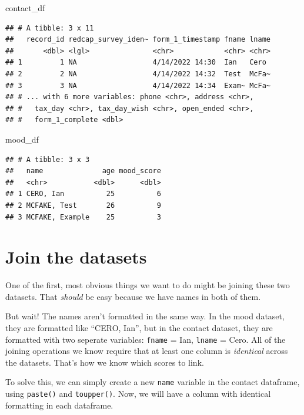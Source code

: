 \documentclass[
]{book}
\newenvironment{Shaded}{\begin{snugshade}}{\end{snugshade}}
\newcommand{\NormalTok}[1]{#1}
\begin{document}
\begin{Shaded}
\begin{Highlighting}[]
\NormalTok{contact\_df}
\end{Highlighting}
\end{Shaded}

\begin{verbatim}
## # A tibble: 3 x 11
##   record_id redcap_survey_iden~ form_1_timestamp fname lname
##       <dbl> <lgl>               <chr>            <chr> <chr>
## 1         1 NA                  4/14/2022 14:30  Ian   Cero 
## 2         2 NA                  4/14/2022 14:32  Test  McFa~
## 3         3 NA                  4/14/2022 14:34  Exam~ McFa~
## # ... with 6 more variables: phone <chr>, address <chr>,
## #   tax_day <chr>, tax_day_wish <chr>, open_ended <chr>,
## #   form_1_complete <dbl>
\end{verbatim}

\begin{Shaded}
\begin{Highlighting}[]
\NormalTok{mood\_df}
\end{Highlighting}
\end{Shaded}

\begin{verbatim}
## # A tibble: 3 x 3
##   name              age mood_score
##   <chr>           <dbl>      <dbl>
## 1 CERO, Ian          25          6
## 2 MCFAKE, Test       26          9
## 3 MCFAKE, Example    25          3
\end{verbatim}

\hypertarget{join-the-datasets}{%
\section{Join the datasets}\label{join-the-datasets}}

One of the first, most obvious things we want to do might be joining these two datasets. That \emph{should} be easy because we have names in both of them.

But wait! The names aren't formatted in the same way. In the mood dataset, they are formatted like ``CERO, Ian'', but in the contact dataset, they are formatted with two seperate variables: \texttt{fname} = Ian, \texttt{lname} = Cero. All of the joining operations we know require that at least one column is \emph{identical} across the datasets. That's how we know which scores to link.

To solve this, we can simply create a new \texttt{name} variable in the contact dataframe, using \texttt{paste()} and \texttt{toupper()}. Now, we will have a column with identical formatting in each dataframe.
\end{document}
